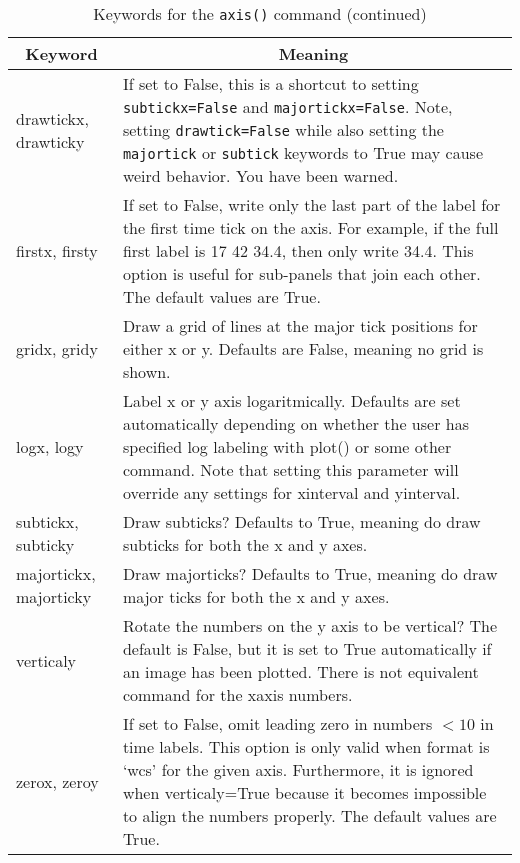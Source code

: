 \documentclass[12pt]{article}
\begin{document}
\setcounter{table}{0} %

\begin{table}
\caption{Keywords for the \texttt{axis()} command (continued)}
\begin{center}
\begin{tabular}{p{1in}p{4in}}
\hline
\hline
\multicolumn{1}{c}{Keyword} & \multicolumn{1}{c}{Meaning}\\
\hline
drawtickx, drawticky   & If set to False, this is a shortcut to setting
                         \texttt{subtickx=False} and \texttt{majortickx=False}.
                         Note, setting \texttt{drawtick=False} while also
                         setting the \texttt{majortick} or \texttt{subtick}
                         keywords to True may cause weird behavior.  You have
                         been warned. \\
firstx, firsty         & If set to False, write only the last part of the label
                         for the first time tick on the axis.  For example, if
                         the full first label is 17 42 34.4, then only write
                         34.4. This option is useful for sub-panels that join
                         each other. The default values are True.\\
gridx, gridy           & Draw a grid of lines at the major tick positions for
                         either x or y.  Defaults are False, meaning no grid is
                         shown.\\
logx, logy             & Label x or y axis logaritmically.  Defaults are set
                         automatically depending on whether the user
                         has specified log labeling with plot() or some other
                         command. Note that setting this parameter will override
                         any settings for xinterval and yinterval.\\
subtickx, subticky     & Draw subticks?  Defaults to True, meaning do draw
                         subticks for both the x and y axes.\\
majortickx, majorticky & Draw majorticks? Defaults to True, meaning do draw
                         major ticks for both the x and y axes.\\
verticaly              & Rotate the numbers on the y axis to be vertical?  The
                         default is False, but it is set to True automatically
                         if an image has been plotted.  There is not equivalent
                         command for the xaxis numbers.\\
zerox, zeroy           & If set to False, omit leading zero in numbers $< 10$
                         in time labels.  This option is only valid when format
                         is `wcs' for the given axis.  Furthermore, it is
                         ignored when verticaly=True because it becomes
                         impossible to align the numbers properly.  The default
                         values are True.\\
\hline
\end{tabular}
\end{center}
\end{table}
\end{document}
